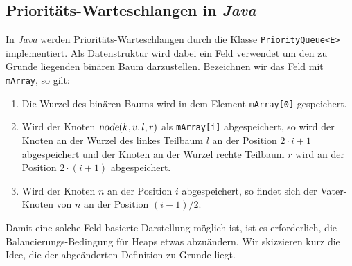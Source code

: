 \subsection{Priorit\"ats-Warteschlangen in \textsl{Java}}
In \textsl{Java} werden Priorit\"ats-Warteschlangen durch die Klasse \texttt{PriorityQueue<E>}
implementiert.  Als Datenstruktur wird dabei ein Feld verwendet um den zu Grunde liegenden
bin\"aren Baum darzustellen.  Bezeichnen wir das Feld mit \texttt{mArray}, so gilt:
\begin{enumerate}
\item Die Wurzel des bin\"aren Baums wird in dem Element \texttt{mArray[0]} gespeichert.
\item Wird der Knoten $\textsl{node}(k,v,l,r)$ als \texttt{mArray[i]} abgespeichert,
      so wird der Knoten an der Wurzel des linkes Teilbaum $l$ an der Position $2\cdot i
      +1$ abgespeichert und der Knoten an der Wurzel
      rechte Teilbaum $r$ wird an der Position $2 \cdot (i+1)$ abgespeichert.
\item Wird der Knoten $n$ an der Position $i$ abgespeichert, so findet sich der
      Vater-Knoten von $n$ an der Position $(i - 1) / 2$.
\end{enumerate}
Damit eine solche Feld-basierte Darstellung m\"oglich ist, ist es erforderlich, die
Balancierungs-Bedingung f\"ur Heaps etwas abzu\"andern.  Wir skizzieren kurz die Idee,
die der abge\"anderten Definition zu Grunde liegt.
